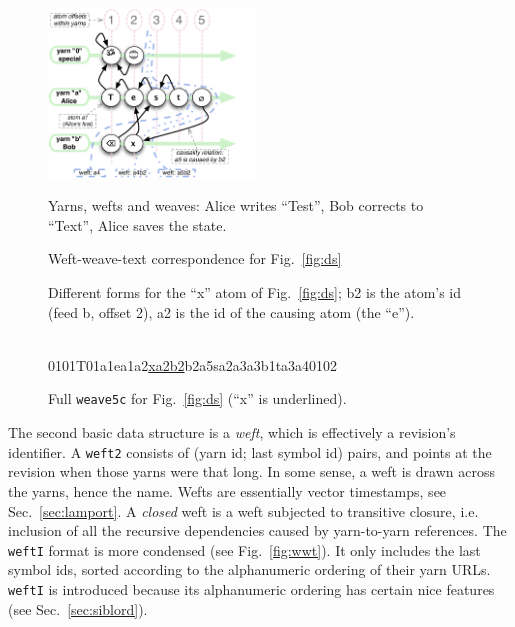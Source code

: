 \documentclass{sig-alternate}
\begin{document}
\begin{figure}[t]
\includegraphics[width=0.49\textwidth]{feedsnweaves-5.pdf}
\caption{Yarns, wefts and weaves: Alice writes ``Test'', Bob corrects to ``Text'', Alice saves the state. \label{fig:ds} }

\caption{Weft-weave-text correspondence for Fig.~\ref{fig:ds} \label{fig:wwt}}

\caption {Different forms for the ``x'' atom of Fig.~\ref{fig:ds}; b2 is the atom's id (feed b, offset 2), a2 is the id of the causing atom (the ``e''). \label{fig:forms}}
~\\
{ {\aum}0101{T}01a1{e}a1a2{\underline{xa2b2}}{\zero}b2a5{s}a2a3{\bsp}a3b1{t}a3a4{\eoa}0102 }
\caption{ Full {\tt weave5c} for Fig.~\ref{fig:ds} (``x'' is underlined). \label{fig:w5c} }
\end{figure}
The second basic data structure is a \emph{weft}, which is effectively a revision's identifier.
A {\tt weft2} consists of (yarn id; last symbol id) pairs, and points at the revision when those yarns were that long. 
In some sense, a weft is drawn across the yarns, hence the name.
Wefts are essentially vector timestamps, see Sec.~\ref{sec:lamport}.
A \emph{closed} weft is a weft subjected to transitive closure, i.e. inclusion of all the recursive dependencies caused by yarn-to-yarn references.
The {\tt weftI} format is more condensed (see Fig.~\ref{fig:wwt}). It only includes the last symbol ids, sorted according to the alphanumeric ordering of their yarn URLs.
{\tt weftI} is introduced because its alphanumeric ordering has certain nice features  (see Sec.~\ref{sec:siblord}).
\end{document}
